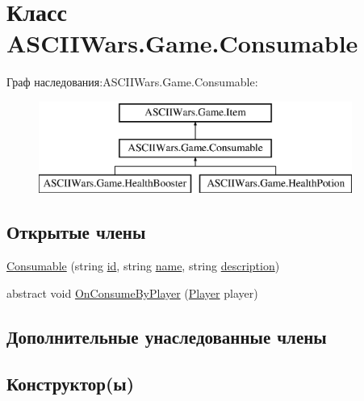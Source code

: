 \hypertarget{class_a_s_c_i_i_wars_1_1_game_1_1_consumable}{}\section{Класс A\+S\+C\+I\+I\+Wars.\+Game.\+Consumable}
\label{class_a_s_c_i_i_wars_1_1_game_1_1_consumable}
Граф наследования\+:A\+S\+C\+I\+I\+Wars.\+Game.\+Consumable\+:\begin{figure}[H]
\begin{center}
\leavevmode
\includegraphics[height=3.000000cm]{class_a_s_c_i_i_wars_1_1_game_1_1_consumable}
\end{center}
\end{figure}
\subsection*{Открытые члены}
\begin{DoxyCompactItemize}
\item 
\hyperlink{class_a_s_c_i_i_wars_1_1_game_1_1_consumable_aa445dfd287fc22cfb76b133614fec0c2}{Consumable} (string \hyperlink{class_a_s_c_i_i_wars_1_1_game_1_1_item_a744d51f7684a4e46a1f834f8666db58e}{id}, string \hyperlink{class_a_s_c_i_i_wars_1_1_game_1_1_item_a994b9ec5f10c123e4345da159c090091}{name}, string \hyperlink{class_a_s_c_i_i_wars_1_1_game_1_1_item_a6ff41e953ccebc64a8df8f8c434535a0}{description})
\item 
abstract void \hyperlink{class_a_s_c_i_i_wars_1_1_game_1_1_consumable_a6aac67fe076ca39cb850e3720461fff8}{On\+Consume\+By\+Player} (\hyperlink{class_a_s_c_i_i_wars_1_1_game_1_1_player}{Player} player)
\end{DoxyCompactItemize}
\subsection*{Дополнительные унаследованные члены}


\subsection{Конструктор(ы)}
\hypertarget{class_a_s_c_i_i_wars_1_1_game_1_1_consumable_aa445dfd287fc22cfb76b133614fec0c2}{}\label{class_a_s_c_i_i_wars_1_1_game_1_1_consumable_aa445dfd287fc22cfb76b133614fec0c2} 
